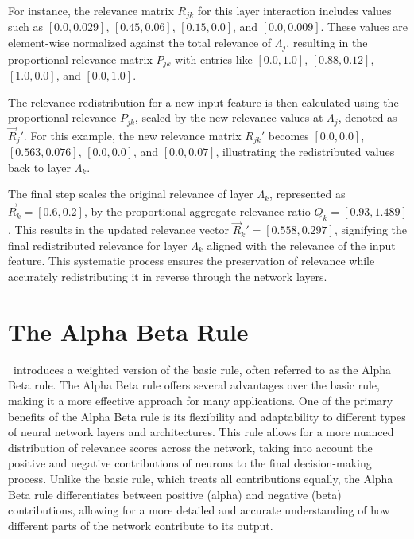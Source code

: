 For instance, the relevance matrix \(R_{jk}\) for this layer interaction includes values such as \([0.0, 0.029]\), \([0.45, 0.06]\), \([0.15, 0.0]\), and \([0.0, 0.009]\). These values are element-wise normalized against the total relevance of \(\Lambda_j\), resulting in the proportional relevance matrix \(P_{jk}\) with entries like \([0.0, 1.0]\), \([0.88, 0.12]\), \([1.0, 0.0]\), and \([0.0, 1.0]\). 

The relevance redistribution for a new input feature is then calculated using the proportional relevance \(P_{jk}\), scaled by the new relevance values at \(\Lambda_j\), denoted as \(\vec{R}_j'\). For this example, the new relevance matrix \(R_{jk}'\) becomes \([0.0, 0.0]\), \([0.563, 0.076]\), \([0.0, 0.0]\), and \([0.0, 0.07]\), illustrating the redistributed values back to layer \(\Lambda_k\). 

The final step scales the original relevance of layer \(\Lambda_k\), represented as \(\vec{R}_k = [0.6, 0.2]\), by the proportional aggregate relevance ratio \(Q_k = [0.93, 1.489]\). This results in the updated relevance vector \(\vec{R}_k' = [0.558, 0.297]\), signifying the final redistributed relevance for layer \(\Lambda_k\) aligned with the relevance of the input feature. This systematic process ensures the preservation of relevance while accurately redistributing it in reverse through the network layers. 

\section{The Alpha Beta Rule}
\label{section:more}

\LRP\ introduces a weighted version of the basic rule, often referred to as the Alpha Beta rule. The Alpha Beta rule offers several advantages over the basic rule, making it a more effective approach for many applications. One of the primary benefits of the Alpha Beta rule is its flexibility and adaptability to different types of neural network layers and architectures. This rule allows for a more nuanced distribution of relevance scores across the network, taking into account the positive and negative contributions of neurons to the final decision-making process. Unlike the basic rule, which treats all contributions equally, the Alpha Beta rule differentiates between positive (alpha) and negative (beta) contributions, allowing for a more detailed and accurate understanding of how different parts of the network contribute to its output.

